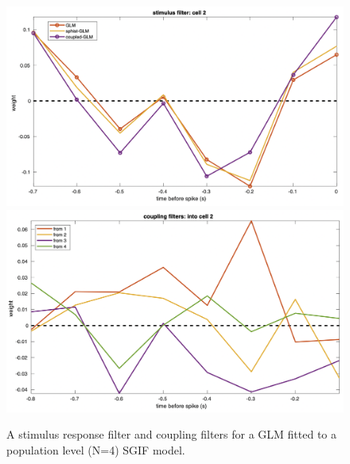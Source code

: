 \documentclass[mphil,deptreport,ianc]{infthesis} %
\begin{document}

\begin{figure}
    \centering
    \vspace{-0.1in}
    \includegraphics[width=0.8\columnwidth]{figures/matlab/font_fix/export_GLM_filters_pred_bin_size_0_1_cell_2_target_GT_model_mesoGIF_N_4_1.png}
    \includegraphics[width=0.8\columnwidth]{figures/matlab/font_fix/export_GLM_filters_pred_bin_size_0_1_cell_2_target_GT_model_mesoGIF_N_4_2.png}
    \vspace{-0.1in}
    \caption{A stimulus response filter and coupling filters for a GLM fitted to a population level (N=4) SGIF model.}
    \label{fig:GLM_mesoGIF_filters}
\end{figure}
\end{document}
